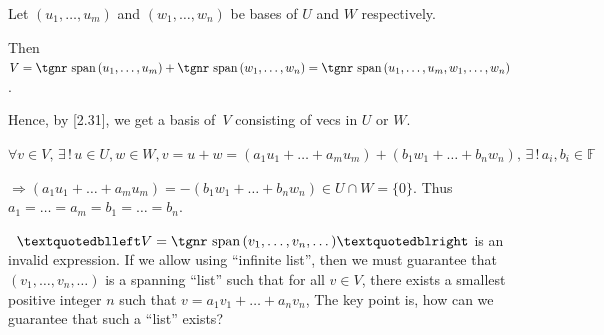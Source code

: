 \documentclass[a4paper, 11pt, UTF8]{article}
\newcommand{\Largebfx}[1]{{\Large\tgbfx#1}}
\def\i{{\textup{\tgnr i}}}
\def\Spn{{\textup{\tgnr span}}\,}
\def\Fbb{{\mathbb{F}}}
\def\Rbb{{\mathbb{R}}}
\def\Cbb{{\mathbb{C}}}
\def\BulletPoint{{\small\bullet}}
\def\ChEnd{\rightline{\Largebfx{E{\small NDED}}}\par\vspace{6pt}}
\begin{document}
\begin{large}
Let $(u_1,\dots,u_m)$ and $(w_1,\dots,w_n)$ be bases of $U$ and $W$ respectively.\par\quad
Then $V=\Spn(u_1,\dots,u_m)+\Spn(w_1,\dots,w_n)=\Spn(u_1,\dots,u_m,w_1,\dots,w_n)$.\par\quad
Hence, by [2.31], we get a basis of \,$V$ consisting of vecs in $U$ or $W.$\PfEnd
\SepLine

\par\quad
$\forall v\in V,\,\exists\,!\,u\in U,w\in W,v=u+w=(a_1 u_1+\dots+a_m u_m)+(b_1 w_1+\dots+b_n w_n),\,\exists\,!\,a_i,b_i\in\Fbb$\par\quad
$\Rightarrow (a_1 u_1+\dots+a_m u_m)=-(b_1 w_1+\dots+b_n w_n)\in U\cap W=\{0\}$. Thus $a_1=\dots=a_m=b_1=\dots=b_n.$\PfEnd
\SepLine


\BulletPoint \,\hspace{1pt}\TextB{}
$“V=\Spn(v_1,\dots,v_n,\dots)”$ is an invalid expression.\TextB{}
If we allow using $“$infinite list$”$, then we must guarantee that $(v_1,\dots,v_n,\dots)$ is a spanning $“$list$”$\TextB{}
such that for all $v\in V$, there exists a smallest positive integer $n$ such that $v=a_1 v_1+\dots+a_n v_n$,\TextB{}
The key point is, how can we guarantee that such a $“$list$”$ exists?\par
\SepLine
\ChEnd


\end{large}
\end{document}
